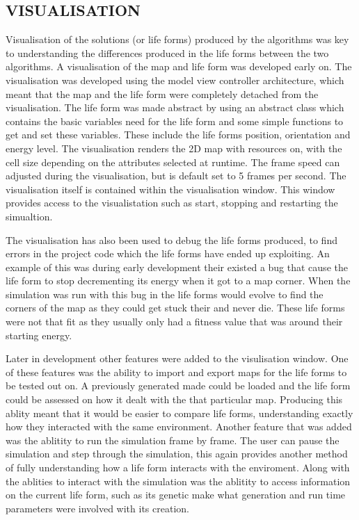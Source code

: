 \documentclass[10pt,twocolumn]{article}
\begin{document}
\subsection{VISUALISATION}
Visualisation of the solutions (or life forms) produced by the algorithms was key
to understanding the differences produced in the life forms between the two algorithms. A visualisation of the map and life form
was developed early on. The visualisation was developed using the model view controller architecture,
which meant that the map and the life form were completely detached from the visualisation.
The life form was made abstract by using an abstract class which contains the basic variables need for the life
form and some simple functions to get and set these variables. These include the life forms position, orientation
and energy level. The visualisation renders the 2D map with resources on, with the cell size depending on the attributes selected at runtime. The frame speed can
adjusted during the visualisation, but is default set to 5 frames per second. The visualisation itself is contained within the visualisation window. This window
provides access to the visualistation such as start, stopping and restarting the simualtion.


The visualisation has also been used to debug the life forms produced, to find errors in the project code which the life forms have ended up exploiting. An example
of this was during early development their existed a bug that cause the life form to stop decrementing its energy when it got to a map corner. When the simulation
was run with this bug in the life forms would evolve to find the corners of the map as they could get stuck their and never die. These life forms were not that fit 
as they usually only had a fitness value that was around their starting energy.

Later in development other features were added to the visulisation window. One of these features was the ability to import and export maps for the life forms to be
tested out on. A previously generated made could be loaded and the life form could be assessed on how it dealt with the that particular map. Producing this ablity meant that it would be easier to compare life forms, understanding exactly how they interacted with the same environment.
Another feature that was added was the ablitity to run the simulation frame by frame. The user can pause the simulation and step through the simulation, this again provides another method of fully understanding how a life form interacts with the enviroment. 
Along with the ablities to interact with the simulation was the ablitity to access information on the current life form, such as its genetic make what generation
and run time parameters were involved with its creation.
\end{document}
